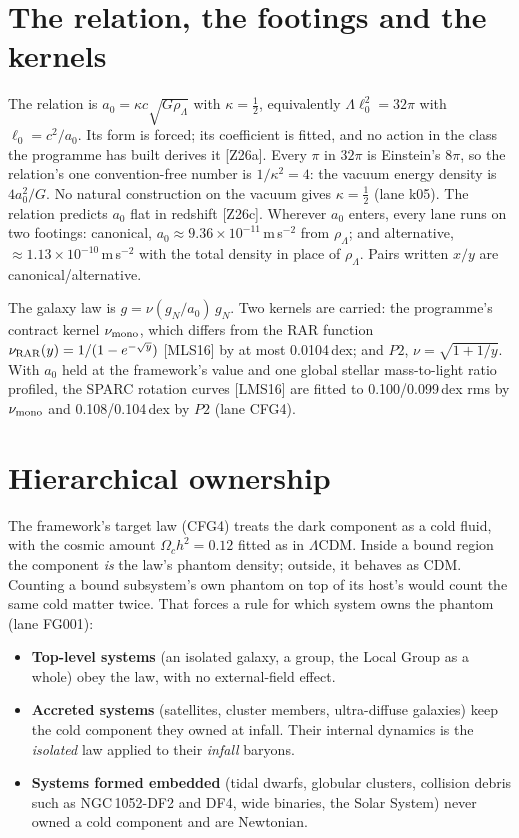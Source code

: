 \documentclass[10pt]{article}
\begin{document}
\section{The relation, the footings and the kernels}\label{sec:rel}

The relation is $a_0=\kappa c\sqrt{G\rho_\Lambda}$ with $\kappa=\tfrac12$, equivalently $\Lambda\ell_0^2=32\pi$ with $\ell_0=c^2/a_0$. Its form is forced; its coefficient is fitted, and no action in the class the programme has built derives it [Z26a]. Every $\pi$ in $32\pi$ is Einstein's $8\pi$, so the relation's one convention-free number is $1/\kappa^2=4$: the vacuum energy density is $4a_0^2/G$. No natural construction on the vacuum gives $\kappa=\tfrac12$ (lane k05). The relation predicts $a_0$ flat in redshift [Z26c]. Wherever $a_0$ enters, every lane runs on two footings: canonical, $a_0\approx9.36\times10^{-11}$\,m\,s$^{-2}$ from $\rho_\Lambda$; and alternative, $\approx1.13\times10^{-10}$\,m\,s$^{-2}$ with the total density in place of $\rho_\Lambda$. Pairs written $x/y$ are canonical/alternative.

The galaxy law is $g=\nu(g_N/a_0)\,g_N$. Two kernels are carried: the programme's contract kernel $\nu_{\rm mono}$, which differs from the RAR function $\nu_{\rm RAR}(y)=1/(1-e^{-\sqrt y})$ [MLS16] by at most 0.0104\,dex; and $P2$, $\nu=\sqrt{1+1/y}$. With $a_0$ held at the framework's value and one global stellar mass-to-light ratio profiled, the SPARC rotation curves [LMS16] are fitted to 0.100/0.099\,dex rms by $\nu_{\rm mono}$ and 0.108/0.104\,dex by $P2$ (lane CFG4).

\section{Hierarchical ownership}\label{sec:own}

The framework's target law (CFG4) treats the dark component as a cold fluid, with the cosmic amount $\Omega_ch^2=0.12$ fitted as in $\Lambda$CDM. Inside a bound region the component \emph{is} the law's phantom density; outside, it behaves as CDM. Counting a bound subsystem's own phantom on top of its host's would count the same cold matter twice. That forces a rule for which system owns the phantom (lane FG001):

\begin{itemize}
\item \textbf{Top-level systems} (an isolated galaxy, a group, the Local Group as a whole) obey the law, with no external-field effect.
\item \textbf{Accreted systems} (satellites, cluster members, ultra-diffuse galaxies) keep the cold component they owned at infall. Their internal dynamics is the \emph{isolated} law applied to their \emph{infall} baryons.
\item \textbf{Systems formed embedded} (tidal dwarfs, globular clusters, collision debris such as NGC\,1052-DF2 and DF4, wide binaries, the Solar System) never owned a cold component and are Newtonian.
\end{itemize}
\end{document}
